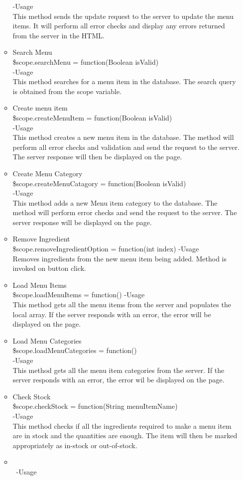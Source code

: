 \documentclass[a4paper,12pt]{article}
\begin{document}
\begin{enumerate}
\begin{itemize}
		-Usage\\
		This method sends the update request to the server to update the menu items. It will perform all error checks and display any errors returned from the server in the HTML.
		\item Search Menu\\
		\$scope.searchMenu = function(Boolean isValid)\\
		-Usage\\
		This method searches for a menu item in the database. The search query is obtained from the scope variable.
		\item Create menu item\\
		\$scope.createMenuItem = function(Boolean isValid)\\
		-Usage\\
		This method creates a new menu item in the database. The method will perform all error checks and validation and send the request to the server. The server response will then be displayed on the page.
		\item Create Menu Category\\
		\$scope.createMenuCatagory = function(Boolean isValid)\\
		-Usage\\
		This method adds a new Menu item category to the database. The method will perform error checks and send the request to the server. The server response will be displayed on the page.
		\item Remove Ingredient\\
		\$scope.removeIngredientOption = function(int index)
		-Usage\\
		Removes ingredients from the  new menu item being added. Method is invoked on button click.
		\item Load Menu Items\\
		\$scope.loadMenuItems = function()
		-Usage\\
		This method gets all the menu items from the server and populates the local array. If the server responds with an error, the error will be displayed on the page.
		\item Load Menu Categories\\
		\$scope.loadMenuCategories = function()\\
		-Usage\\
		This method gets all the menu item categories from the server. If the server responds with an error, the error wil be displayed on the page.
		\item Check Stock\\
		\$scope.checkStock = function(String menuItemName)\\
		-Usage\\
		This method checks if all the ingredients required to make a menu item are in stock and the quantities are enough. The item will then be marked appropriately as in-stock or out-of-stock.
		\item \\
		\
		-Usage\\
			
	\end{itemize}
	
\end{enumerate}
\end{document}
